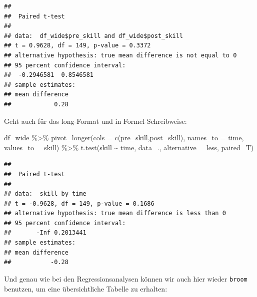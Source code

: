 \documentclass[
]{book}
\newenvironment{Shaded}{\begin{snugshade}}{\end{snugshade}}
\newcommand{\AttributeTok}[1]{\textcolor[rgb]{0.77,0.63,0.00}{#1}}
\newcommand{\ConstantTok}[1]{\textcolor[rgb]{0.00,0.00,0.00}{#1}}
\newcommand{\FunctionTok}[1]{\textcolor[rgb]{0.00,0.00,0.00}{#1}}
\newcommand{\NormalTok}[1]{#1}
\newcommand{\SpecialCharTok}[1]{\textcolor[rgb]{0.00,0.00,0.00}{#1}}
\newcommand{\StringTok}[1]{\textcolor[rgb]{0.31,0.60,0.02}{#1}}
\begin{document}
\begin{verbatim}
## 
##  Paired t-test
## 
## data:  df_wide$pre_skill and df_wide$post_skill
## t = 0.9628, df = 149, p-value = 0.3372
## alternative hypothesis: true mean difference is not equal to 0
## 95 percent confidence interval:
##  -0.2946581  0.8546581
## sample estimates:
## mean difference 
##            0.28
\end{verbatim}

Geht auch für das long-Format und in Formel-Schreibweise:

\begin{Shaded}
\begin{Highlighting}[]
\NormalTok{df\_wide }\SpecialCharTok{\%\textgreater{}\%} 
  \FunctionTok{pivot\_longer}\NormalTok{(}\AttributeTok{cols =} \FunctionTok{c}\NormalTok{(pre\_skill,post\_skill),}
               \AttributeTok{names\_to =} \StringTok{\textquotesingle{}time\textquotesingle{}}\NormalTok{,}
               \AttributeTok{values\_to =} \StringTok{\textquotesingle{}skill\textquotesingle{}}\NormalTok{) }\SpecialCharTok{\%\textgreater{}\%} 
  \FunctionTok{t.test}\NormalTok{(skill }\SpecialCharTok{\textasciitilde{}}\NormalTok{ time, }\AttributeTok{data=}\NormalTok{.,}
         \AttributeTok{alternative =} \StringTok{\textquotesingle{}less\textquotesingle{}}\NormalTok{, }\AttributeTok{paired=}\NormalTok{T)}
\end{Highlighting}
\end{Shaded}

\begin{verbatim}
## 
##  Paired t-test
## 
## data:  skill by time
## t = -0.9628, df = 149, p-value = 0.1686
## alternative hypothesis: true mean difference is less than 0
## 95 percent confidence interval:
##       -Inf 0.2013441
## sample estimates:
## mean difference 
##           -0.28
\end{verbatim}

Und genau wie bei den Regressionsanalysen können wir auch hier wieder \texttt{broom} benutzen, um eine übersichtliche Tabelle zu erhalten:

\begin{Shaded}
\end{Shaded}
\end{document}
